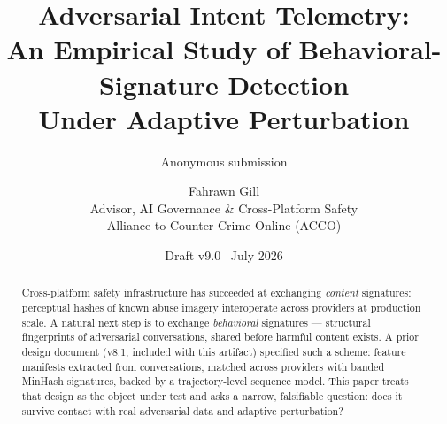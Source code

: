 \documentclass[11pt]{article}
\title{\vspace{-1.2cm}\textbf{Adversarial Intent Telemetry:\\An Empirical Study of Behavioral-Signature Detection\\Under Adaptive Perturbation}}
\author{Anonymous submission}
\author{Fahrawn Gill\\ \small Advisor, AI Governance \& Cross-Platform Safety \\ \small Alliance to Counter Crime Online (ACCO)}
\date{Draft v9.0 \textbullet\ July 2026}
\begin{document}
\maketitle
\thispagestyle{fancy}

\begin{abstract}
\noindent Cross-platform safety infrastructure has succeeded at exchanging \emph{content} signatures: perceptual hashes of known abuse imagery interoperate across providers at production scale. A natural next step is to exchange \emph{behavioral} signatures --- structural fingerprints of adversarial conversations, shared before harmful content exists. A prior design document (v8.1, included with this artifact) specified such a scheme: feature manifests extracted from conversations, matched across providers with banded MinHash signatures, backed by a trajectory-level sequence model. This paper treats that design as the object under test and asks a narrow, falsifiable question: does it survive contact with real adversarial data and adaptive perturbation?


\end{abstract}
\end{document}
